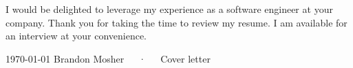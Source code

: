 \documentclass[11pt, a4paper]{coverletter}
\newenvironment{coverletter}{}{}
\begin{document}
\begin{coverletter}
\begin{body}
{\begin{clparagraphs}
\begin{clparagraph}
\end{clparagraph}
\begin{clparagraph}
I would be delighted to leverage my experience as a software engineer at your company. Thank you for taking the time to review my resume. I am available for an interview at your convenience.
\end{clparagraph}
\end{clparagraphs}}
\end{body}
\begin{closing}
\makeletterend
\end{closing}
\begin{enclosures}
\end{enclosures}
\end{coverletter}
\makefooter
{\today}
{Brandon Mosher~~~·~~~Cover letter}
{\thepage}
\end{document}
